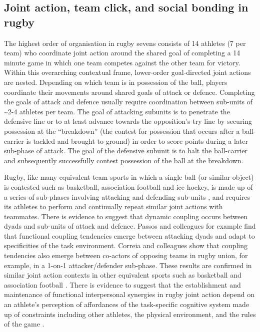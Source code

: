     \subsection{Joint action, team click, and social bonding in rugby}
The highest order of organisation in rugby sevens consists of 14 athletes (7 per team) who coordinate joint action around the shared goal of completing a 14 minute game in which one team competes against the other team for victory.  Within this overarching contextual frame, lower-order goal-directed joint actions are nested.  Depending on which team is in possession of the ball, players coordinate their movements around shared goals of attack or defence.  Completing the goals of attack and defence usually require coordination between sub-units of \sim 2-4 athletes per team.  The goal of attacking subunits is to penetrate the defensive line or to at least advance towards the opposition's try line by securing possession at the ``breakdown'' (the contest for possession that occurs after a ball-carrier is tackled and brought to ground) in order to score points during a later sub-phase of attack.  The goal of the defensive subunit is to halt the ball-carrier and subsequently successfully contest possession of the ball at the breakdown.

Rugby, like many equivalent team sports in which a single ball (or similar object) is contested such as basketball, association football and ice hockey, is made up of a series of sub-phases involving attacking and defending sub-units \citep{Passos2011}, and requires its athletes to perform and continually repeat similar joint actions with teammates. There is evidence to suggest that dynamic coupling occurs between dyads and sub-units of attack and defence\citep{Passos2011,Correia2014}.  Passos and colleagues \textcite{Passos2011} for example find that functional coupling tendencies emerge between attacking dyads and adapt to specificities of the task environment.  Correia and colleagues \textcite{Correia2014} show that coupling tendencies also emerge between co-actors of opposing teams in rugby union, for example, in a 1-on-1 attacker/defender sub-phase.  These results are confirmed in similar joint action contexts in other equivalent sports such as basketball and association football \citep{Duarte2013}. There is evidence to suggest that the establishment and maintenance of functional  interpersonal synergies in rugby joint action depend on an athlete's perception of affordances of the task-specific cognitive system made up of constraints including other athletes, the physical environment, and the rules of the game \citep{Passos2012}.

